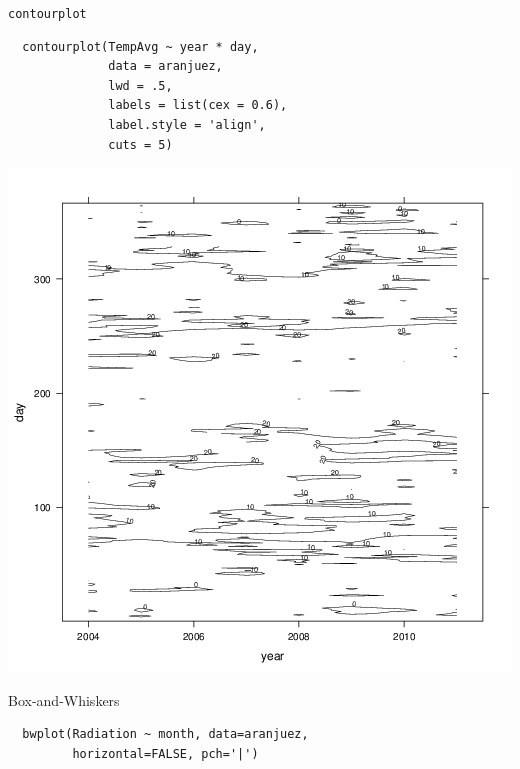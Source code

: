 \documentclass[xcolor={usenames,svgnames,dvipsnames}]{beamer}
\begin{document}
\begin{frame}[fragile,label={sec:orgheadline45}]{\texttt{contourplot}}
 \lstset{language=R,label= ,caption= ,captionpos=b,numbers=none}
\begin{lstlisting}
  contourplot(TempAvg ~ year * day,
              data = aranjuez,
              lwd = .5,
              labels = list(cex = 0.6),
              label.style = 'align',
              cuts = 5)
\end{lstlisting}
\end{frame}

\begin{frame}[label={sec:orgheadline46}]{}
\includegraphics[width=.9\linewidth]{figs/contourplot.png}
\end{frame}

\begin{frame}[fragile,label={sec:orgheadline47}]{Box-and-Whiskers}
 \lstset{language=R,label= ,caption= ,captionpos=b,numbers=none}
\begin{lstlisting}
  bwplot(Radiation ~ month, data=aranjuez,
         horizontal=FALSE, pch='|')
\end{lstlisting}
\end{frame}
\end{document}
